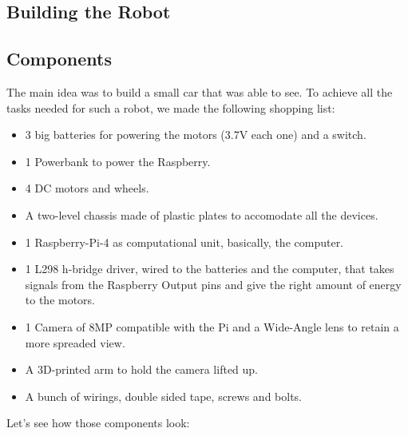 \documentclass[12pt,a4paper]{article}
\begin{document}
\begin{large}
\section{Building the Robot}


\subsection{Components}

The main idea was to build a small car that was able to see. To achieve all the tasks needed for such a robot, we made the following shopping list: 
\begin{itemize}
  \item 3 big batteries for powering the motors (3.7V each one) and a switch.
  \item 1 Powerbank to power the Raspberry.
  \item 4 DC motors and wheels.
  \item A two-level chassis made of plastic plates to accomodate all the devices.
  \item 1 Raspberry-Pi-4 as computational unit, basically, the computer.
  \item 1 L298 h-bridge driver, wired to the batteries and the computer, that takes signals from the Raspberry Output pins and give the right amount of energy to the motors.
  \item 1 Camera of 8MP compatible with the Pi and a Wide-Angle lens to retain a more spreaded view.
  \item A 3D-printed arm to hold the camera lifted up.
  \item A bunch of wirings, double sided tape, screws and bolts.
\end{itemize}
Let's see how those components look: 


\end{large}
\end{document}
